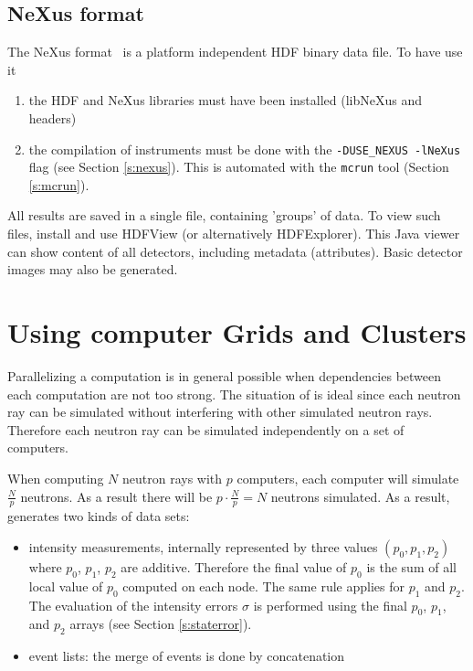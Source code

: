 \subsection{NeXus format}
\label{r:nexus}

The NeXus format~\cite{nexus_webpage} is a platform independent HDF binary data
file. To have \MCS use it
\begin{enumerate}
\item the HDF and NeXus libraries must have been installed (libNeXus and headers)
\item the compilation of instruments must be done with the
  \verb+-DUSE_NEXUS -lNeXus+ flag (see Section \ref{s:nexus}). This is
  automated with the \verb+mcrun+ tool (Section \ref{s:mcrun}).
\end{enumerate}
All results are saved in a single file, containing 'groups' of data. To view
such files, install and use HDFView (or alternatively HDFExplorer). This Java
viewer can show content of all detectors, including metadata (attributes). Basic
detector images may also be generated.

\section{Using computer Grids and Clusters}
\label{s:run-mpi}

Parallelizing a computation is in general possible when dependencies between
  each computation are not too strong. The situation of \MCS is
  ideal since each neutron ray can be simulated without interfering with
  other simulated neutron rays. Therefore each neutron ray can be simulated
  independently on a set of computers.

  When computing $N$ neutron rays with $p$ computers, each computer will
  simulate $\frac{N}{p}$ neutrons. As a result there will be $p \cdot
  \frac{N}{p} = N$ neutrons simulated. As a result, \MCS generates two kinds of
  data sets:
\begin{itemize}
\item intensity measurements, internally represented by three
  values $(p_0, p_1, p_2)$ where $p_0$, $p_1$, $p_2$ are
  additive. Therefore the final value of $p_0$ is the sum of all
  local value of  $p_0$ computed on each node. The same rule applies
  for $p_1$ and $p_2$. The evaluation of the intensity errors $\sigma$
  is performed using the final $p_0$, $p_1$, and $p_2$ arrays (see Section \ref{s:staterror}).
\item event lists: the merge of events is done by concatenation
\end{itemize}

